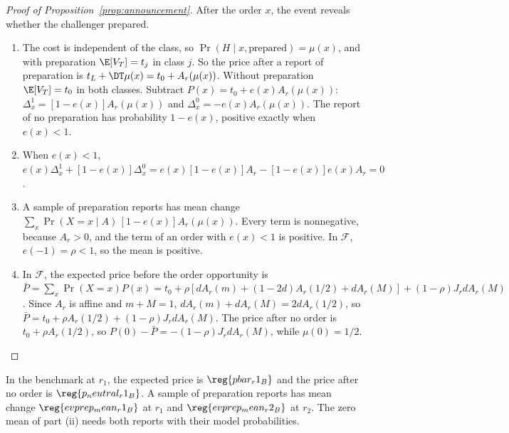 \begin{proof}[Proof of Proposition~\ref{prop:announcement}]
After the order \(x\), the event reveals whether the challenger prepared.
\begin{enumerate}[label=(\roman*),leftmargin=2em]
\item The cost is independent of the class, so \(\Pr(H\mid x,\text{prepared})=\mu(x)\), and with preparation
\(\E[V_T]=t_j\) in class \(j\). So the price after a report of preparation is \(t_L+\DT\mu(x)=t_0+A_r(\mu(x))\). Without
preparation \(\E[V_T]=t_0\) in both classes. Subtract \(P(x)=t_0+e(x)A_r(\mu(x))\): \(\Delta^1_x=[1-e(x)]A_r(\mu(x))\) and
\(\Delta^0_x=-e(x)A_r(\mu(x))\). The report of no preparation has probability \(1-e(x)\), positive exactly when
\(e(x)<1\).
\item When \(e(x)<1\), \(e(x)\Delta^1_x+[1-e(x)]\Delta^0_x=e(x)[1-e(x)]A_r-[1-e(x)]e(x)A_r=0\).
\item A sample of preparation reports has mean change \(\sum_x\Pr(X=x\mid A)\,[1-e(x)]A_r(\mu(x))\). Every term is
nonnegative, because \(A_r>0\), and the term of an order with \(e(x)<1\) is positive. In \(\mathcal F\), \(e(-1)=\rho<1\),
so the mean is positive.
\item In \(\mathcal F\), the expected price before the order opportunity is
\(\bar P=\sum_x\Pr(X=x)P(x)=t_0+\rho[dA_r(m)+(1-2d)A_r(1/2)+dA_r(M)]+(1-\rho)J_rdA_r(M)\). Since \(A_r\) is affine and
\(m+M=1\), \(dA_r(m)+dA_r(M)=2dA_r(1/2)\), so \(\bar P=t_0+\rho A_r(1/2)+(1-\rho)J_rdA_r(M)\). The price after no order
is \(t_0+\rho A_r(1/2)\), so \(P(0)-\bar P=-(1-\rho)J_rdA_r(M)\), while \(\mu(0)=1/2\).\qedhere
\end{enumerate}
\end{proof}
In the benchmark at \(r_1\), the expected price is \(\reg{pbar_r1_B}\) and the price after no order is
\(\reg{p_neutral_r1_B}\). A sample of preparation reports has mean change \(\reg{evprep_mean_r1_B}\) at \(r_1\) and
\(\reg{evprep_mean_r2_B}\) at \(r_2\). The zero mean of part (ii) needs both reports with their model probabilities.

